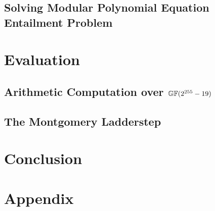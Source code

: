 \documentclass[sigconf, anonymous]{acmart}
\begin{document}
\subsection{Solving Modular Polynomial Equation Entailment Problem}
\label{subsection:solving-algebraic-equations}



\section{Evaluation}
\label{section:evaluation}


\subsection{Arithmetic Computation over $\mathbb{GF}(2^{255}-19)$}
\label{subection:evaluation:multiplication}


\subsection{The Montgomery Ladderstep}
\label{subsection:evaluation:ladder-step}



\section{Conclusion}
\label{section:conclusion}


\newpage

%



\appendix
\section{Appendix}
\label{section:appendix}


\end{document}
